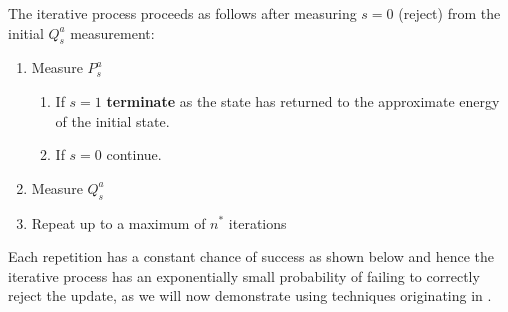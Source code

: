 \documentclass[aps,floatfix,10pt,amssymb,amsfont,amsmath,superscriptaddress,float,nofootinbib,longbibliography,nobalancelastpage,twocolumn]{revtex4-2}
\begin{document}
The iterative process proceeds as follows after measuring $s=0$ (reject) from the initial $Q_s^a$ measurement: 
\begin{enumerate}
    \item Measure $P_s^a$
        \begin{enumerate}
            \item If $s=1$ \textbf{terminate} as the state has returned to the approximate energy of the initial state.
            \item If $s=0$ continue.
        \end{enumerate}
    \item Measure $Q_s^a$
    \item Repeat up to a maximum of $n^*$ iterations
\end{enumerate}
Each repetition has a constant chance of success as shown below and hence the iterative process has an exponentially small probability of failing to correctly reject the update, as we will now demonstrate using techniques originating in \cite{MarriottWatrous}. 
\end{document}
